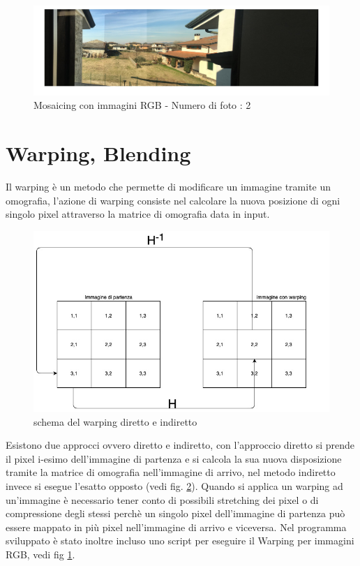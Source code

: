 \documentclass[11pt, oneside]{article}   	%
\begin{document}
\begin{figure}[H]
\includegraphics[width=\textwidth]{RGB_mosaicing}
\caption{Mosaicing con immagini RGB - Numero di foto : 2}
\label{fig:rgb_warp}
\end{figure}

\pagebreak

\section{Warping, Blending}
Il warping è un metodo che permette di modificare un immagine tramite un omografia,  l'azione di warping consiste nel calcolare la nuova posizione di ogni singolo pixel attraverso la matrice di omografia data in input.




\begin{figure}[H]
	\includegraphics[width= \textwidth]{warping_schema.jpg}
	\caption{schema del warping diretto e indiretto}
	\label{fig:warp}
\end{figure}


Esistono due approcci ovvero diretto e indiretto, con l'approccio diretto si prende il pixel i-esimo dell'immagine di partenza e si calcola la sua nuova disposizione tramite la matrice di omografia nell'immagine di arrivo, nel metodo indiretto invece si esegue l'esatto opposto (vedi fig. \ref{fig:warp}).
Quando si applica un warping ad un'immagine è necessario tener conto di possibili stretching dei pixel o di compressione degli stessi perchè un singolo pixel dell'immagine di partenza può essere mappato in più pixel nell'immagine di arrivo e viceversa.
Nel programma sviluppato è stato inoltre incluso uno script per eseguire il Warping per immagini RGB, vedi fig \ref{fig:rgb_warp}.
\end{document}
